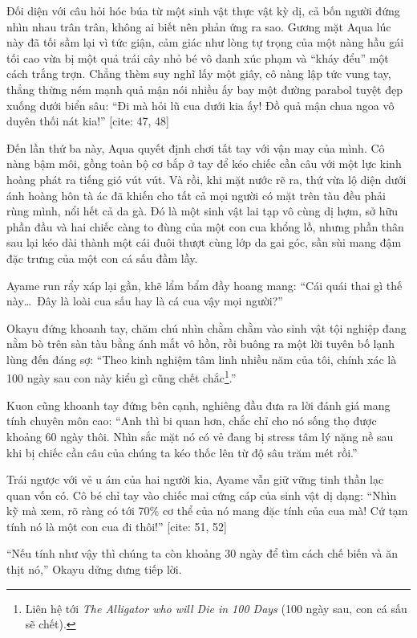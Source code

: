 \documentclass[../main.tex]{subfiles}
\begin{document}
Đối diện với câu hỏi hóc búa từ một sinh vật thực vật kỳ dị, cả bốn người đứng nhìn nhau trân trân, không ai biết nên phản ứng ra sao. Gương mặt Aqua lúc này đã tối sầm lại vì tức giận, cảm giác như lòng tự trọng của một nàng hầu gái tối cao vừa bị một quả trái cây nhỏ bé vô danh xúc phạm và ``kháy đểu'' một cách trắng trợn. Chẳng thèm suy nghĩ lấy một giây, cô nàng lập tức vung tay, thẳng thừng ném mạnh quả mận nói nhiều ấy bay một đường parabol tuyệt đẹp xuống dưới biển sâu: ``Đi mà hỏi lũ cua dưới kia ấy! Đồ quả mận chua ngoa vô duyên thối nát kia!'' [cite: 47, 48]

Đến lần thứ ba này, Aqua quyết định chơi tất tay với vận may của mình. Cô nàng bậm môi, gồng toàn bộ cơ bắp ở tay để kéo chiếc cần câu với một lực kinh hoàng phát ra tiếng gió vút vút. Và rồi, khi mặt nước rẽ ra, thứ vừa lộ diện dưới ánh hoàng hôn tà ác đã khiến cho tất cả mọi người có mặt trên tàu đều phải rùng mình, nổi hết cả da gà. Đó là một sinh vật lai tạp vô cùng dị hợm, sở hữu phần đầu và hai chiếc càng to đùng của một con cua khổng lồ, nhưng phần thân sau lại kéo dài thành một cái đuôi thượt cùng lớp da gai góc, sần sùi mang đậm đặc trưng của một con cá sấu đầm lầy.

Ayame run rẩy xáp lại gần, khẽ lẩm bẩm đầy hoang mang: ``Cái quái thai gì thế này\dots\ Đây là loài cua sấu hay là cá cua vậy mọi người?''

Okayu đứng khoanh tay, chăm chú nhìn chằm chằm vào sinh vật tội nghiệp đang nằm bò trên sàn tàu bằng ánh mắt vô hồn, rồi buông ra một lời tuyên bố lạnh lùng đến đáng sợ: ``Theo kinh nghiệm tâm linh nhiều năm của tôi, chính xác là 100 ngày sau con này kiểu gì cũng chết chắc\footnote{Liên hệ tới \textit{The Alligator who will Die in 100 Days} (100 ngày sau, con cá sấu sẽ chết).}.''

Kuon cũng khoanh tay đứng bên cạnh, nghiêng đầu đưa ra lời đánh giá mang tính chuyên môn cao: ``Anh thì bi quan hơn, chắc chỉ cho nó sống thọ được khoảng 60 ngày thôi. Nhìn sắc mặt nó có vẻ đang bị stress tâm lý nặng nề sau khi bị chiếc cần câu của chúng ta kéo thốc lên từ độ sâu trăm mét rồi.''

Trái ngược với vẻ u ám của hai người kia, Ayame vẫn giữ vững tinh thần lạc quan vốn có. Cô bé chỉ tay vào chiếc mai cứng cáp của sinh vật dị dạng: ``Nhìn kỹ mà xem, rõ ràng có tới 70\% cơ thể của nó mang đặc tính của cua mà! Cứ tạm tính nó là một con cua đi thôi!'' [cite: 51, 52]

``Nếu tính như vậy thì chúng ta còn khoảng 30 ngày để tìm cách chế biến và ăn thịt nó,'' Okayu dửng dưng tiếp lời.
\end{document}
